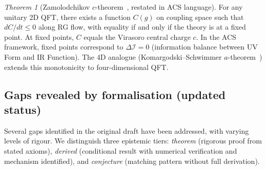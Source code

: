 \documentclass[11pt,a4paper]{article}
\theoremstyle{plain}
\theoremstyle{definition}
\theoremstyle{remark}
\newtheorem*{theorem*}{Theorem}
\newcommand{\DI}{\Delta\mathcal{I}}
\begin{document}
\begin{theorem*}[Zamolodchikov $c$-theorem~\cite{Zamolodchikov1986}, restated in ACS language]\label{thm:c-theorem}
For any unitary 2D QFT, there exists a function $C(g)$ on coupling space such that $dC/dt \leq 0$ along RG flow, with equality if and only if the theory is at a fixed point.  At fixed points, $C$ equals the Virasoro central charge $c$.  In the ACS framework, fixed points correspond to $\DI = 0$ (information balance between UV Form and IR Function).  The 4D analogue (Komargodski--Schwimmer $a$-theorem~\cite{KomargodskiSchwimmer2011}) extends this monotonicity to four-dimensional QFT.
\end{theorem*}

\subsection{Gaps revealed by formalisation (updated status)}

Several gaps identified in the original draft have been addressed,
with varying levels of rigour.  We distinguish three epistemic tiers:
\emph{theorem} (rigorous proof from stated axioms),
\emph{derived} (conditional result with numerical verification
and mechanism identified), and \emph{conjecture} (matching pattern
without full derivation).
\end{document}
